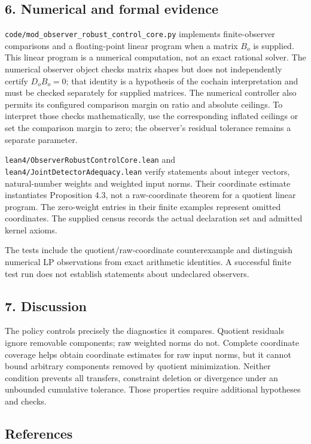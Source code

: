 \documentclass[
]{article}
\begin{document}
\subsection{6. Numerical and formal
evidence}\label{numerical-and-formal-evidence}

\nolinkurl{code/mod_observer_robust_control_core.py} implements
finite-observer comparisons and a floating-point linear program when a
matrix \(B_o\) is supplied. This linear program is a numerical
computation, not an exact rational solver. The numerical observer object
checks matrix shapes but does not independently certify \(D_oB_o=0\);
that identity is a hypothesis of the cochain interpretation and must be
checked separately for supplied matrices. The numerical controller also
permits its configured comparison margin on ratio and absolute ceilings.
To interpret those checks mathematically, use the corresponding inflated
ceilings or set the comparison margin to zero; the observer's residual
tolerance remains a separate parameter.

\nolinkurl{lean4/ObserverRobustControlCore.lean} and
\nolinkurl{lean4/JointDetectorAdequacy.lean} verify statements about
integer vectors, natural-number weights and weighted input norms. Their
coordinate estimate instantiates Proposition 4.3, not a raw-coordinate
theorem for a quotient linear program. The zero-weight entries in their
finite examples represent omitted coordinates. The supplied census
records the actual declaration set and admitted kernel axioms.

The tests include the quotient/raw-coordinate counterexample and
distinguish numerical LP observations from exact arithmetic identities.
A successful finite test run does not establish statements about
undeclared observers.

\subsection{7. Discussion}\label{discussion}

The policy controls precisely the diagnostics it compares. Quotient
residuals ignore removable components; raw weighted norms do not.
Complete coordinate coverage helps obtain coordinate estimates for raw
input norms, but it cannot bound arbitrary components removed by
quotient minimization. Neither condition prevents all transfers,
constraint deletion or divergence under an unbounded cumulative
tolerance. Those properties require additional hypotheses and checks.

\subsection{References}\label{references}
\end{document}
